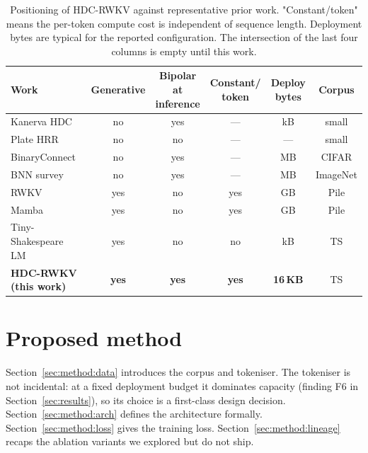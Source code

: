 \documentclass[runningheads]{llncs}
\begin{document}
\begin{table}[t]
\centering
\caption{Positioning of HDC-RWKV against representative prior work.
"Constant/token" means the per-token compute cost is independent of
sequence length. Deployment bytes are typical for the reported
configuration. The intersection of the last four columns is empty
until this work.}
\label{tab:related}
\small
\begin{tabular}{@{}lccccc@{}}
\toprule
Work                          & Generative & \shortstack{Bipolar at\\ inference} & \shortstack{Constant/\\ token} & \shortstack{Deploy\\ bytes} & Corpus \\
\midrule
Kanerva HDC~\cite{kanerva2009hyperdimensional}       & no    & yes & --- & kB   & small \\
Plate HRR~\cite{plate1995holographic}                & no    & no  & --- & ---  & small \\
BinaryConnect~\cite{courbariaux2016binaryconnect}    & no    & yes & --- & MB   & CIFAR \\
BNN survey~\cite{qin2020binary}                      & no    & yes & --- & MB   & ImageNet \\
RWKV~\cite{peng2023rwkv}                             & yes   & no  & yes & GB   & Pile \\
Mamba~\cite{gu2023mamba}                             & yes   & no  & yes & GB   & Pile \\
Tiny-Shakespeare LM~\cite{karpathy2015tinyshakespeare} & yes & no  & no  & kB   & TS \\
\textbf{HDC-RWKV (this work)}                        & \textbf{yes} & \textbf{yes} & \textbf{yes} & \textbf{16\,KB} & TS \\
\bottomrule
\end{tabular}
\end{table}


\section{Proposed method}
\label{sec:method}

Section~\ref{sec:method:data} introduces the corpus and tokeniser. The
tokeniser is not incidental: at a fixed deployment budget it dominates
capacity (finding F6 in Section~\ref{sec:results}), so its choice is a
first-class design decision. Section~\ref{sec:method:arch} defines the
architecture formally. Section~\ref{sec:method:loss} gives the training
loss. Section~\ref{sec:method:lineage} recaps the ablation variants we
explored but do not ship.
\end{document}

